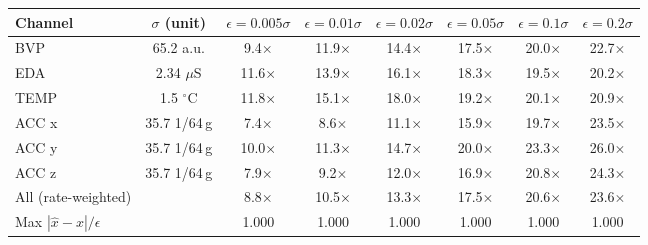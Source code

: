 \begin{tabular}{lccccccc}
\toprule
Channel & $\sigma$ (unit) & $\epsilon=0.005\sigma$ & $\epsilon=0.01\sigma$ & $\epsilon=0.02\sigma$ & $\epsilon=0.05\sigma$ & $\epsilon=0.1\sigma$ & $\epsilon=0.2\sigma$ \\
\midrule
BVP & 65.2 a.u. & 9.4$\times$ & 11.9$\times$ & 14.4$\times$ & 17.5$\times$ & 20.0$\times$ & 22.7$\times$ \\
EDA & 2.34 $\mu$S & 11.6$\times$ & 13.9$\times$ & 16.1$\times$ & 18.3$\times$ & 19.5$\times$ & 20.2$\times$ \\
TEMP & 1.5 $^\circ$C & 11.8$\times$ & 15.1$\times$ & 18.0$\times$ & 19.2$\times$ & 20.1$\times$ & 20.9$\times$ \\
ACC x & 35.7 1/64\,g & 7.4$\times$ & 8.6$\times$ & 11.1$\times$ & 15.9$\times$ & 19.7$\times$ & 23.5$\times$ \\
ACC y & 35.7 1/64\,g & 10.0$\times$ & 11.3$\times$ & 14.7$\times$ & 20.0$\times$ & 23.3$\times$ & 26.0$\times$ \\
ACC z & 35.7 1/64\,g & 7.9$\times$ & 9.2$\times$ & 12.0$\times$ & 16.9$\times$ & 20.8$\times$ & 24.3$\times$ \\
\midrule
All (rate-weighted) & & 8.8$\times$ & 10.5$\times$ & 13.3$\times$ & 17.5$\times$ & 20.6$\times$ & 23.6$\times$ \\
Max $|\hat{x}-x|/\epsilon$ & & 1.000 & 1.000 & 1.000 & 1.000 & 1.000 & 1.000 \\
\bottomrule
\end{tabular}
